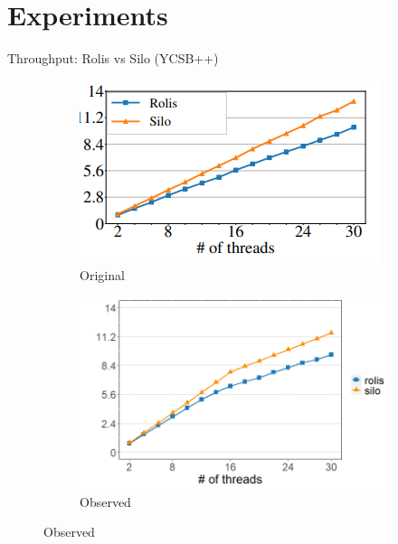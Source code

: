 \documentclass[xcolor=dvipsnames]{beamer}
\begin{document}
   
    \section{Experiments}

    \begin{frame}{Throughput: Rolis vs Silo (YCSB++)}
        
        \begin{figure}
            \begin{subfigure}[h]{0.5\textwidth}
                \includegraphics[scale=0.65]{rolis_fig10_ycsb.png}
                \caption{Original}
            \end{subfigure}%
            \hfill
            \begin{subfigure}[h]{0.5\textwidth}
                \includegraphics[scale=0.30]{fig10_ycsb.png}
                \caption{Observed}
            \end{subfigure}
        \end{figure}

    \end{frame}
\end{document}
